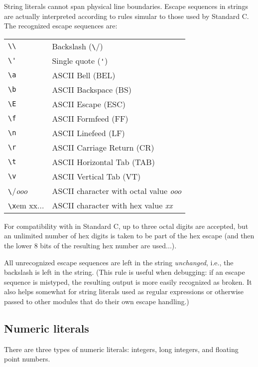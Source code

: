 String literals cannot span physical line boundaries.  Escape
sequences in strings are actually interpreted according to rules
simular to those used by Standard C.  The recognized escape sequences
are:

\begin{center}
\begin{tabular}{|l|l|}
\hline
\verb/\\/	& Backslash (\verb/\/) \\
\verb/\'/	& Single quote (\verb/'/) \\
\verb/\a/	& ASCII Bell (BEL) \\
\verb/\b/	& ASCII Backspace (BS) \\
\verb/\E/	& ASCII Escape (ESC) \\
\verb/\f/	& ASCII Formfeed (FF) \\
\verb/\n/	& ASCII Linefeed (LF) \\
\verb/\r/	& ASCII Carriage Return (CR) \\
\verb/\t/	& ASCII Horizontal Tab (TAB) \\
\verb/\v/	& ASCII Vertical Tab (VT) \\
\verb/\/{\em ooo}	& ASCII character with octal value {\em ooo} \\
\verb/\x/{em xx...}	& ASCII character with hex value {\em xx} \\
\hline
\end{tabular}
\end{center}

For compatibility with in Standard C, up to three octal digits are
accepted, but an unlimited number of hex digits is taken to be part of
the hex escape (and then the lower 8 bits of the resulting hex number
are used...).

All unrecognized escape sequences are left in the string {\em
unchanged}, i.e., the backslash is left in the string.  (This rule is
useful when debugging: if an escape sequence is mistyped, the
resulting output is more easily recognized as broken.  It also helps
somewhat for string literals used as regular expressions or otherwise
passed to other modules that do their own escape handling.)

\subsection{Numeric literals}

There are three types of numeric literals: integers, long integers,
and floating point numbers.

